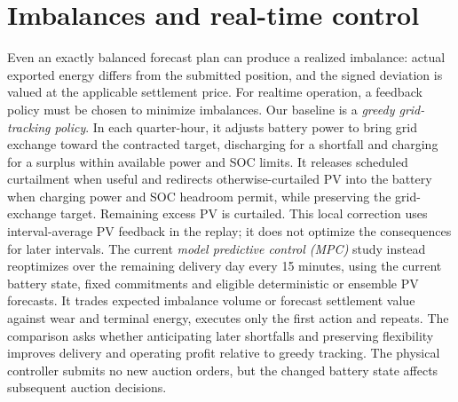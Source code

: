 \documentclass[11pt,a4paper]{article}
\begin{document}
\section{Imbalances and real-time control}
Even an exactly balanced forecast plan can produce a realized imbalance:
actual exported energy differs from the submitted position, and the signed
deviation is valued at the applicable settlement price. For realtime operation, 
a feedback policy must be chosen to minimize imbalances. Our baseline is a
\emph{greedy grid-tracking policy}. In each quarter-hour, it adjusts battery
power to bring grid exchange toward the contracted target, discharging for
a shortfall and charging for a surplus within available power and SOC limits.
It releases scheduled curtailment when useful and redirects otherwise-curtailed
PV into the battery when charging power and SOC headroom permit, while
preserving the grid-exchange target. Remaining excess PV is curtailed.
This local correction uses interval-average PV
feedback in the replay; it does not optimize the consequences for later
intervals. The current \emph{model predictive control (MPC)} study instead
reoptimizes over the remaining delivery day every 15 minutes, using the current
battery state, fixed commitments and eligible deterministic or ensemble PV
forecasts. It trades expected imbalance volume or forecast settlement value
against wear and terminal energy, executes only the first action and repeats.
The comparison asks whether anticipating later shortfalls and preserving
flexibility improves delivery and operating profit relative to greedy tracking.
The physical controller submits no new auction orders, but the changed battery
state affects subsequent auction decisions.
\end{document}
